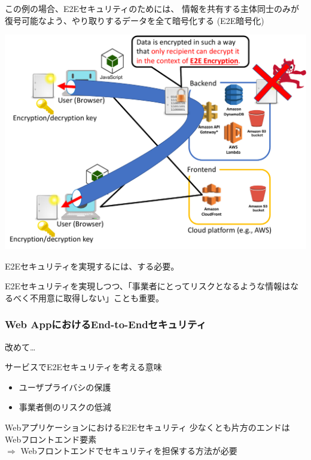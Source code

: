 \documentclass[12pt,dvipdfmx]{beamer}
\begin{document}
\begin{frame}
この例の場合、E2Eセキュリティのためには、
情報を共有する主体同士のみが復号可能なよう、やり取りするデータを全て暗号化する (\alert{E2E暗号化})
\begin{center}
\includegraphics[width=0.8\linewidth]{Figs/e2e3.pdf}
\end{center}
\end{frame}

\begin{frame}
\begin{alertblock}{}
E2Eセキュリティを実現するには、する必要。
\end{alertblock}

E2Eセキュリティを実現しつつ、「事業者にとってリスクとなるような情報はなるべく不用意に取得しない」ことも重要。
\end{frame}

\begin{frame}
\frametitle{Web AppにおけるEnd-to-Endセキュリティ}
改めて…
\begin{block}{\small サービスでE2Eセキュリティを考える意味}
\begin{itemize}
 \item ユーザプライバシの保護
 \item 事業者側のリスクの低減
\end{itemize}
\end{block}

\begin{exampleblock}{\small WebアプリケーションにおけるE2Eセキュリティ}
少なくとも片方のエンドはWebフロントエンド要素\\
$\Rightarrow$ \alert{Webフロントエンドでセキュリティを担保する方法が必要}
\end{exampleblock}

\end{frame}
\end{document}
